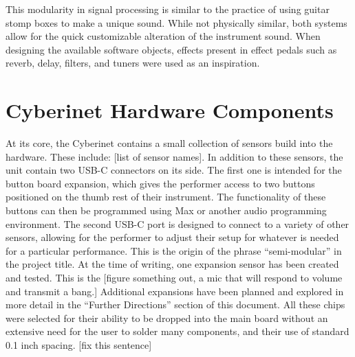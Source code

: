 This modularity in signal processing is similar to the practice of using guitar stomp boxes to make a unique sound. While not physically similar, both systems allow for the quick customizable alteration of the instrument sound. When designing the available software objects, effects present in effect pedals such as reverb, delay, filters, and tuners were used as an inspiration.











\chapter{Cyberinet Hardware Components}

At its core, the Cyberinet contains a small collection of sensors build into the hardware. These include: [list of sensor names]. In addition to these sensors, the unit contain two USB-C connectors on its side. The first one is intended for the button board expansion, which gives the performer access to two buttons positioned on the thumb rest of their instrument. The functionality of these buttons can then be programmed using Max or another audio programming environment. The second USB-C port is designed to connect to a variety of other sensors, allowing for the performer to adjust their setup for whatever is needed for a particular performance. This is the origin of the phrase “semi-modular” in the project title. At the time of writing, one expansion sensor has been created and tested. This is the [figure something out, a mic that will respond to volume and transmit a bang.] Additional expansions have been planned and explored in more detail in the “Further Directions” section of this document. 
All these chips were selected for their ability to be dropped into the main board without an extensive need for the user to solder many components, and their use of standard 0.1 inch spacing. [fix this sentence]


